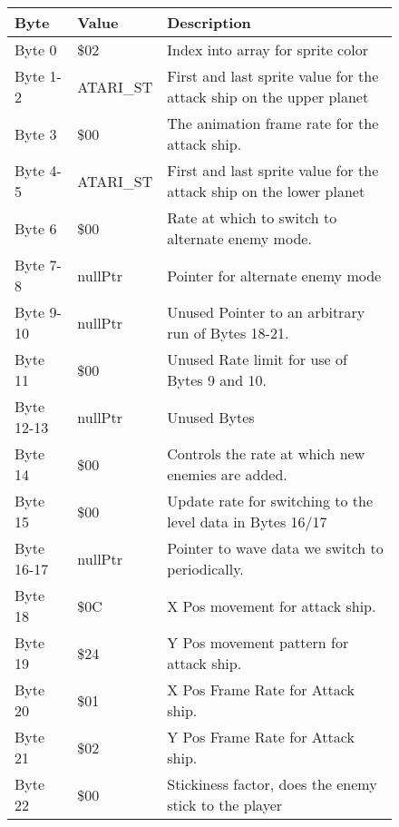 \begin{figure}[H]
{\begin{adjustbox}{width=12cm}
\begin{tabular}{lll}
\toprule
 Byte       & Value              & Description                                                         \\
\midrule
 Byte 0     & \$02                & Index into array for sprite color                                   \\
 Byte 1-2   & ATARI\_ST           & First and last sprite value for the attack ship on the upper planet \\
 Byte 3     & \$00                & The animation frame rate for the attack ship.                       \\
 Byte 4-5   & ATARI\_ST           & First and last sprite value for the attack ship on the lower planet \\
 Byte 6     & \$00                & Rate at which to switch to alternate enemy mode.                    \\
 Byte 7-8   & nullPtr            & Pointer for alternate enemy mode                                    \\
 Byte 9-10  & nullPtr            & Unused Pointer to an arbitrary run of Bytes 18-21.                  \\
 Byte 11    & \$00                & Unused Rate limit for use of Bytes 9 and 10.                        \\
 Byte 12-13 & nullPtr            & Unused Bytes                                                        \\
 Byte 14    & \$00                & Controls the rate at which new enemies are added.                   \\
 Byte 15    & \$00                & Update rate for switching to the level data in Bytes 16/17          \\
 Byte 16-17 & nullPtr            & Pointer to wave data we switch to periodically.                     \\
 Byte 18    & \$0C                & X Pos movement for attack ship.                                     \\
 Byte 19    & \$24                & Y Pos movement pattern for attack ship.                             \\
 Byte 20    & \$01                & X Pos Frame Rate for Attack ship.                                   \\
 Byte 21    & \$02                & Y Pos Frame Rate for Attack ship.                                   \\
 Byte 22    & \$00                & Stickiness factor, does the enemy stick to the player               \\

\end{tabular}
\end{adjustbox}}
\end{figure}
